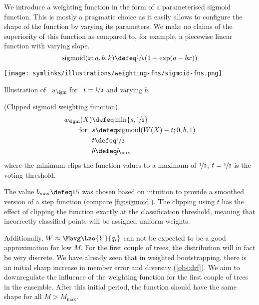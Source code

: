 \documentclass[../main.tex]{subfiles}
\begin{document}
We introduce a weighting function in the form of a parameterised sigmoid function. This is mostly a pragmatic choice as it easily allows to configure the shape of the function by varying its parameters. We make no claims of the superiority of this function as compared to, for example, a piecewise linear function with varying slope.
$$
\text{sigmoid}(x;a,b,k) \defeq \nicefrac{1}{k} (1 + \exp(a-bx))
$$
\begin{marginfigure}
    \texttt{[image: symlinks/illustrations/weighting-fns/sigmoid-fns.png]}
    \caption{Illustration of ~$w_{\text{sigm}}$ for ~$t = \nicefrac{1}{2}$ and varying $b$.}
    \label{fig:sigmoid}
\end{marginfigure}
\begin{definition} (Clipped sigmoid weighting function)
    \label{def:sigmoid}
    \begin{align*}
    w_{\text{sigm} }(X) &\defeq \min\{ s, \nicefrac{1}{2} \} \\
    \text{for}~ ~ & s \defeq \text{sigmoid}(W(X) - t; 0, b, 1) \\
    & t \defeq \nicefrac{1}{2} \\
    & b \defeq b_\text{max}
    \end{align*}
    where the minimum clips the function values to a maximum of $\nicefrac{1}{2}$, $t = \nicefrac{1}{2}$ is the voting threshold.
\end{definition} 
The value $b_{\text{max}} \defeq 15$ was chosen based on intuition to provide a smoothed version of a step function (compare \cref{fig:sigmoid}). The clipping using $t$ has the effect of clipping the function exactly at the classification threshold, meaning that incorrectly classified points will be assigned uniform weights.

Additionally, $W \approx \Mavg\Lzo{Y}{q_{i}}$ can not be expected to be a good approximation for low $M$. For the first couple of trees, the distribution will in fact be very discrete.  
We have already seen that in weighted bootstrapping, there is an initial sharp increase in member error and diversity (\cf \ref{obs:drf}).
We aim to downregulate the influence of the weighting function for the first couple of trees in the ensemble. After this initial period, the function should have the same shape for all $M > M_{\text{max}}$.
\end{document}
